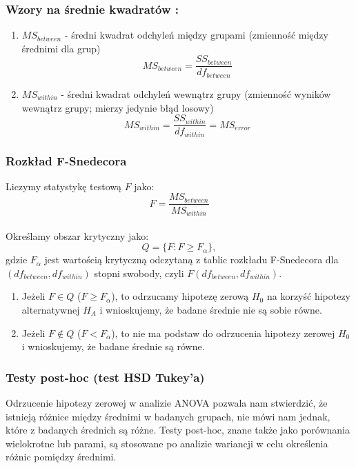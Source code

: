 \documentclass[12pt,a4paper]{article}
\begin{document}
\subsubsection{Wzory na średnie kwadratów \cite{witte2010statistics}:}
\begin{enumerate}
    \item $MS_{between}$ - średni kwadrat odchyleń między grupami (zmienność między średnimi dla grup)
    $$MS_{between}=\frac{SS_{between}}{df_{between}}$$
    \item $MS_{within}$ - średni kwadrat odchyleń wewnątrz grupy (zmienność wyników wewnątrz grupy; mierzy jedynie błąd losowy)
    $$MS_{within}=\frac{SS_{within}}{df_{within}}=MS_{error}$$
\end{enumerate}

\newpage
\subsubsection{Rozkład F-Snedecora}
Liczymy statystykę testową $F$ jako:
$$F=\frac{MS_{between}}{MS_{within}}$$
\\
Określamy obszar krytyczny jako:
$$Q=\{F:F\geq F_{\alpha}\},$$
gdzie $F_{\alpha}$ jest wartością krytyczną odczytaną z tablic rozkładu F-Snedecora dla $(df_{between},df_{within})$ stopni swobody, czyli  $F(df_{between},df_{within})$.
\\
\begin{enumerate}
    \item Jeżeli $F\in Q$ ($F\geq F_{\alpha}$), to odrzucamy hipotezę zerową $H_0$ na korzyść hipotezy alternatywnej $H_A$ i wnioskujemy, że badane średnie nie są sobie równe.
    \item Jeżeli $F\not\in Q$ ($F< F_{\alpha}$), to nie ma podstaw do odrzucenia hipotezy zerowej $H_0$ i wnioskujemy, że badane średnie są równe.
\end{enumerate}

\subsubsection{Testy post-hoc (test HSD Tukey'a)}
Odrzucenie hipotezy zerowej w analizie ANOVA pozwala nam stwierdzić, że istnieją różnice między średnimi
w badanych grupach, nie mówi nam jednak, które z badanych średnich są różne.
Testy post-hoc, znane także jako porównania wielokrotne lub parami, są stosowane po analizie wariancji w celu określenia różnic pomiędzy średnimi.
\\
\end{document}
